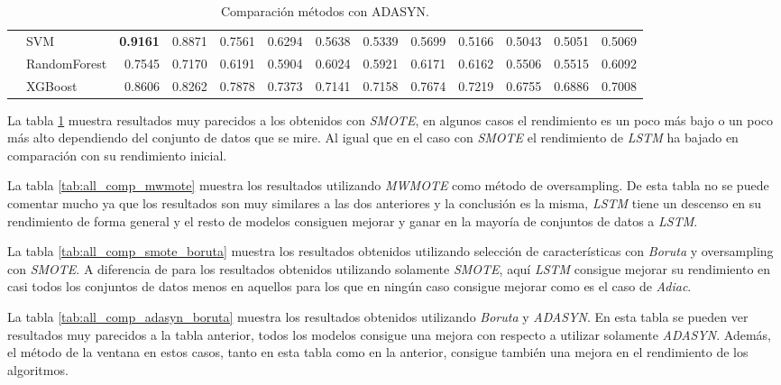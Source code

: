 \begin{table}[h]
\begin{adjustbox}{max width=15cm}
\begin{tabular}{|c|l|r|r|r|r|r|r|r|r|r|r|r|}
		& SVM &  \textbf{0.9161} &  0.8871 &  0.7561 &  0.6294 &  0.5638 &  0.5339 &  0.5699 &  0.5166 &  0.5043 &  0.5051 &  0.5069 \\
		& RandomForest &  0.7545 &  0.7170 &  0.6191 &  0.5904 &  0.6024 &  0.5921 &  0.6171 &  0.6162 &  0.5506 &  0.5515 &  0.6092 \\
		& XGBoost &  0.8606 &  0.8262 &  0.7878 &  0.7373 &  0.7141 &  0.7158 &  0.7674 &  0.7219 &  0.6755 &  0.6886 &  0.7008 \\
		\hline
\end{tabular}
\end{adjustbox}
\caption{Comparación métodos con ADASYN.}
\label{tab:all_comp_adasyn}
\end{table}

La tabla \ref{tab:all_comp_adasyn} muestra resultados muy parecidos a los obtenidos con \textit{SMOTE}, en algunos casos el rendimiento es un poco más bajo o un poco más alto dependiendo del conjunto de datos que se mire. Al igual que en el caso con \textit{SMOTE} el rendimiento de \textit{LSTM} ha bajado en comparación con su rendimiento inicial.\newline

La tabla \ref{tab:all_comp_mwmote} muestra los resultados utilizando \textit{MWMOTE} como método de oversampling. De esta tabla no se puede comentar mucho ya que los resultados son muy similares a las dos anteriores y la conclusión es la misma, \textit{LSTM} tiene un descenso en su rendimiento de forma general y el resto de modelos consiguen mejorar y ganar en la mayoría de conjuntos de datos a \textit{LSTM}.\newline

La tabla \ref{tab:all_comp_smote_boruta} muestra los resultados obtenidos utilizando selección de características con \textit{Boruta} y oversampling con \textit{SMOTE}. A diferencia de para los resultados obtenidos utilizando solamente \textit{SMOTE}, aquí \textit{LSTM} consigue mejorar su rendimiento en casi todos los conjuntos de datos menos en aquellos para los que en ningún caso consigue mejorar como es el caso de \textit{Adiac}.\newline

La tabla \ref{tab:all_comp_adasyn_boruta} muestra los resultados obtenidos utilizando \textit{Boruta} y \textit{ADASYN}. En esta tabla se pueden ver resultados muy parecidos a la tabla anterior, todos los modelos consigue una mejora con respecto a utilizar solamente \textit{ADASYN}. Además, el método de la ventana en estos casos, tanto en esta tabla como en la anterior, consigue también una mejora en el rendimiento de los algoritmos.\newline

